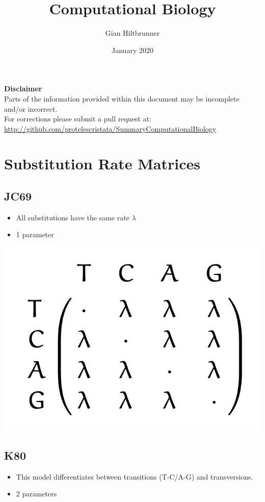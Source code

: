 \documentclass{article}
\title{Computational Biology}
\author{Gian Hiltbrunner}
\date{January 2020}
\begin{document}
\begin{multicols*}{3}

\maketitle

\begin{mdframed}[backgroundcolor=lred] 
    \textbf{Disclaimer}\\
    Parts of the information provided within this document may be incomplete and/or incorrect.\\For corrections please submit a pull request at:
    \url{http://github.com/protelescristata/SummaryComputationalBiology}
\end{mdframed}

\section{Substitution Rate Matrices}

\subsection{JC69}
\begin{itemize}
    \item  All substitutions have the same rate $\lambda$
    \item 1 parameter
\end{itemize}

\begin{center}
    \includegraphics[width=0.5\linewidth]{js69.png}
\end{center}

\subsection{K80}
\begin{itemize}
    \item This model differentiates between transitions (T-C/A-G) and transversions. 
    \item 2 parameters
\end{itemize}


\end{multicols*}
\end{document}
